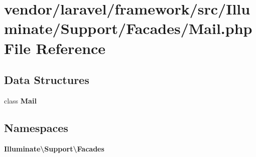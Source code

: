 \section{vendor/laravel/framework/src/\+Illuminate/\+Support/\+Facades/\+Mail.php File Reference}
\label{vendor_2laravel_2framework_2src_2_illuminate_2_support_2_facades_2mail_8php}
\subsection*{Data Structures}
\begin{DoxyCompactItemize}
\item 
class {\bf Mail}
\end{DoxyCompactItemize}
\subsection*{Namespaces}
\begin{DoxyCompactItemize}
\item 
 {\bf Illuminate\textbackslash{}\+Support\textbackslash{}\+Facades}
\end{DoxyCompactItemize}
